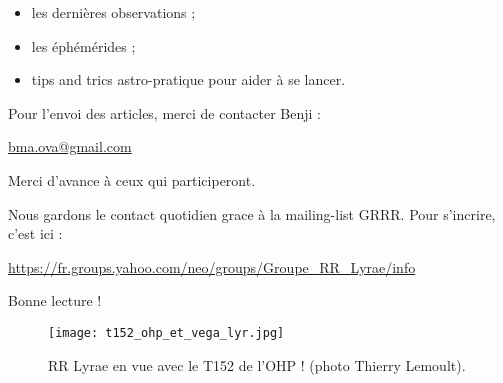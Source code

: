 \documentclass[a4paper,twocolumn]{article}
\begin{document}
{\begin{itemize}

\item les dernières observations ;

\item les éphémérides ;

\item tips and trics astro-pratique pour aider à se lancer.
\end{itemize}

\medskip

Pour l'envoi des articles, merci de contacter Benji : 

\begin{center}\url{bma.ova@gmail.com}\end{center}

Merci d'avance à ceux qui participeront.

Nous gardons le contact quotidien grace à la mailing-list GRRR. Pour s'incrire, c'est ici :

\url{https://fr.groups.yahoo.com/neo/groups/Groupe_RR_Lyrae/info}

\medskip


Bonne lecture ! 




\newpage




\newpage



  
   \begin{figure*}[!ht]
     \centering
     \texttt{[image: t152\_ohp\_et\_vega\_lyr.jpg]}
     \caption{RR Lyrae en vue avec le T152 de l'OHP ! (photo Thierry Lemoult).}
     \label{t152_ohp_et_vega_lyr.jpg}
   \end{figure*}


}
\end{document}
